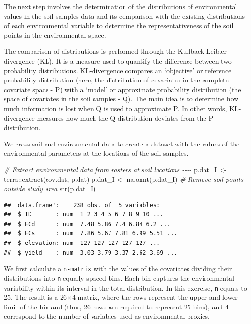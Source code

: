 \documentclass[
]{book}
\newenvironment{Shaded}{\begin{snugshade}}{\end{snugshade}}
\newcommand{\CommentTok}[1]{\textcolor[rgb]{0.56,0.35,0.01}{\textit{#1}}}
\newcommand{\FunctionTok}[1]{\textcolor[rgb]{0.00,0.00,0.00}{#1}}
\newcommand{\NormalTok}[1]{#1}
\newcommand{\OtherTok}[1]{\textcolor[rgb]{0.56,0.35,0.01}{#1}}
\newcommand{\SpecialCharTok}[1]{\textcolor[rgb]{0.00,0.00,0.00}{#1}}
\begin{document}
The next step involves the determination of the distributions of environmental values in the soil samples data and its comparison with the existing distributions of each environmental variable to determine the representativeness of the soil points in the environmental space.

The comparison of distributions is performed through the Kullback-Leibler divergence (KL). It is a measure used to quantify the difference between two probability distributions.
KL-divergence compares an `objective' or reference probability distribution (here, the distribution of covariates in the complete covariate space - P) with a `model' or approximate probability distribution (the space of covariates in the soil samples - Q). The main idea is to determine how much information is lost when Q is used to approximate P. In other words, KL-divergence measures how much the Q distribution deviates from the P distribution.

We cross soil and environmental data to create a dataset with the values of the environmental parameters at the locations of the soil samples.

\begin{Shaded}
\begin{Highlighting}[]
\CommentTok{\# Extract environmental data from rasters at soil locations {-}{-}{-}{-}}
\NormalTok{  p.dat\_I }\OtherTok{\textless{}{-}}\NormalTok{ terra}\SpecialCharTok{::}\FunctionTok{extract}\NormalTok{(cov.dat, p.dat)}
\NormalTok{  p.dat\_I }\OtherTok{\textless{}{-}} \FunctionTok{na.omit}\NormalTok{(p.dat\_I) }\CommentTok{\# Remove soil points outside study area}
  \FunctionTok{str}\NormalTok{(p.dat\_I)}
\end{Highlighting}
\end{Shaded}

\begin{verbatim}
## 'data.frame':    238 obs. of  5 variables:
##  $ ID       : num  1 2 3 4 5 6 7 8 9 10 ...
##  $ ECd      : num  7.48 5.86 7.4 6.84 6.2 ...
##  $ ECs      : num  7.86 5.67 7.81 6.99 5.51 ...
##  $ elevation: num  127 127 127 127 127 ...
##  $ yield    : num  3.03 3.79 3.37 2.62 3.69 ...
\end{verbatim}

We first calculate a \texttt{\textquotesingle{}n-matrix\textquotesingle{}} with the values of the covariates dividing their distributions into \texttt{\textquotesingle{}n\textquotesingle{}} equally-spaced bins. Each bin captures the environmental variability within its interval in the total distribution. In this exercise, \texttt{\textquotesingle{}n\textquotesingle{}} equals to 25. The result is a 26×4 matrix, where the rows represent the upper and lower limit of the bin and (thus, 26 rows are required to represent 25 bins), and 4 correspond to the number of variables used as environmental proxies.
\end{document}
